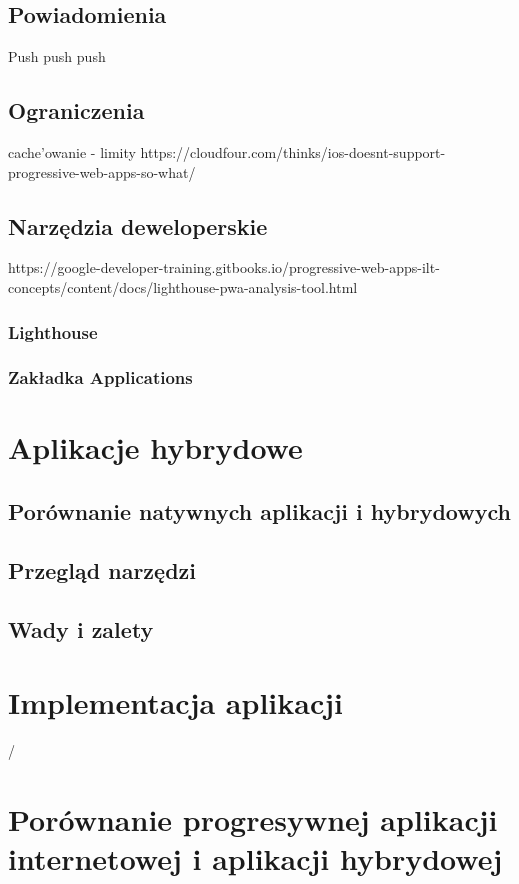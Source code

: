 \documentclass[a4paper,12pt,twoside,openany]{report}
\begin{document}
\section{Powiadomienia}
Push push push
\section{Ograniczenia}
cache'owanie - limity
https://cloudfour.com/thinks/ios-doesnt-support-progressive-web-apps-so-what/
\section{Narzędzia deweloperskie}
https://google-developer-training.gitbooks.io/progressive-web-apps-ilt-concepts/content/docs/lighthouse-pwa-analysis-tool.html
\subsection*{Lighthouse}
\subsection*{Zakładka Applications}

\chapter{Aplikacje hybrydowe} \label{chap:hybrid}
\section{Porównanie natywnych aplikacji i hybrydowych}
\section{Przegląd narzędzi}
\section{Wady i zalety}

\chapter{Implementacja aplikacji}/

\chapter{Porównanie progresywnej aplikacji internetowej i aplikacji hybrydowej}
\end{document}
